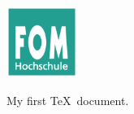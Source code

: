 \documentclass[11pt]{scrartcl}
\begin{document}
\includegraphics[width=2.3cm]{assets/fomLogo}

My first \TeX~document. 
\end{document}
